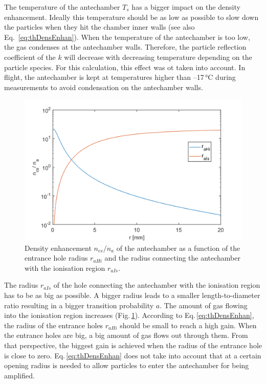 	The temperature of the antechamber $T_s$ has a bigger impact on the density enhancement. Ideally this temperature should be as low as possible to slow down the particles when they hit the chamber inner walls (see also Eq.~\eqref{eq:thDensEnhan}). When the temperature of the antechamber is too low, the gas condenses at the antechamber walls. Therefore, the particle reflection coefficient of the $k$ will decrease with decreasing temperature depending on the particle species. For this calculation, this effect was ot taken into account. In flight, the antechamber is kept at temperatures higher than --17\,\si{\degreeCelsius} during measurements to avoid condensation on the antechamber walls.\\
	\begin{figure}[H] %
		\centering
		\includegraphics[width= .7\textwidth]{Bilder/raHi_raIs.png}
		\caption{Density enhancement $n_{cs}/n_a$ of the antechamber as a function of the entrance hole radius $r_{aHi}$ and the radius connecting the antechamber with the ionisation region $r_{aIs}$.}
		\label{th:densEnhraHiraIs}
	\end{figure}
	The radius $r_{aIs}$ of the hole connecting the antechamber with the ionisation region has to be as big as possible. A bigger radius leads to a smaller length-to-diameter ratio resulting in a bigger transition probability $a$. The amount of gas flowing into the ionisation region increases (Fig.\,\ref{th:densEnhraHiraIs}). According to Eq.\,\eqref{eq:thDensEnhan}, the radius of the entrance holes $r_{aHi}$ should be small to reach a high gain. When the entrance holes are big, a big amount of gas flows out through them. From that perspective, the biggest gain is achieved when the radius of the entrance hole is close to zero. Eq.\,\eqref{eq:thDensEnhan} does not take into account that at a certain opening radius is needed to allow particles to enter the antechamber for being amplified.\\
